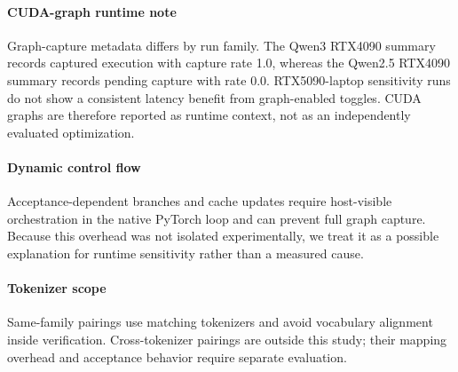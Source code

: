 \paragraph{CUDA-graph runtime note}
Graph-capture metadata differs by run family. The Qwen3 RTX4090 summary
records captured execution with capture rate 1.0, whereas the Qwen2.5
RTX4090 summary records pending capture with rate 0.0. RTX5090-laptop
sensitivity runs do not show a consistent latency benefit from graph-enabled
toggles. CUDA graphs are therefore reported as runtime context, not as an
independently evaluated optimization.

\paragraph{Dynamic control flow}
Acceptance-dependent branches and cache updates require host-visible
orchestration in the native PyTorch loop and can prevent full graph capture.
Because this overhead was not isolated experimentally, we treat it as a
possible explanation for runtime sensitivity rather than a measured cause.

\paragraph{Tokenizer scope}
Same-family pairings use matching tokenizers and avoid vocabulary alignment
inside verification. Cross-tokenizer pairings are outside this study; their
mapping overhead and acceptance behavior require separate evaluation.

